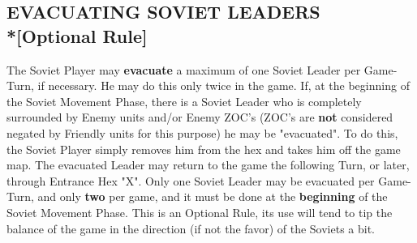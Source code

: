 \subsection{EVACUATING SOVIET LEADERS\\*{[}Optional Rule{]}}

The Soviet Player may \textbf{evacuate} a maximum of one Soviet Leader per Game-Turn, if necessary. He may do this only twice in the game. If, at the beginning of the Soviet Movement Phase, there is a Soviet Leader who is completely surrounded by Enemy units and/or Enemy ZOC's (ZOC's are \textbf{not} considered negated by Friendly units for this purpose) he may be "evacuated". To do this, the Soviet Player simply removes him from the hex and takes him off the game map. The evacuated Leader may return to the game the following Turn, or later, through Entrance Hex "X". Only one Soviet Leader may be evacuated per Game-Turn, and only \textbf{two} per game, and it must be done at the \textbf{beginning} of the Soviet Movement Phase. This is an Optional Rule, its use will tend to tip the balance of the game in the direction (if not the favor) of the Soviets a bit.